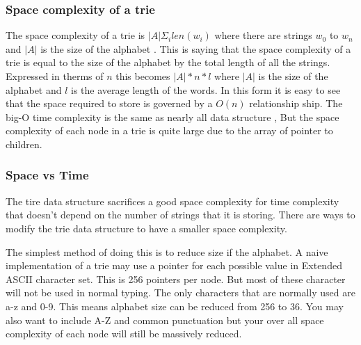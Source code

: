 \documentclass[10pt]{article} %
\begin{document}
			\subsubsection{Space complexity of a trie}
			    The space complexity of a trie is \begin{math} \vert A \vert \Sigma_i len(w_i)\end{math} where there are strings \begin{math} w_0 \end{math} to \begin{math} w_n \end{math} and \begin{math}\vert A \vert \end{math} is the size of the alphabet \cite{book:ADS:complexity}.
			    This is saying that the space complexity of a trie is equal to the size of the alphabet by the total length of all the strings.
			    Expressed in therms of \begin{math} n \end{math} this becomes \begin{math} \vert A \vert * n * l \end{math} where \begin{math}\vert A \vert \end{math} is the size of the alphabet and \begin{math} l \end{math} is the average length of the words.
			    In this form it is easy to see that the space required to store is governed by a  \begin{math} O(n) \end{math} relationship ship. The big-O time complexity is the same as nearly all data structure \cite{website:bigocheatsheet}, But the space complexity of each node in a trie is quite large due to the array of pointer to children.
			    
            \subsubsection{Space vs Time}
                The tire data structure sacrifices a good space complexity for time complexity that doesn't depend on the number of strings that it is storing. 
                There are ways to modify the trie data structure to have a smaller space complexity.
                
                The simplest method of doing this is to reduce size if the alphabet. A naive implementation of a trie may use a pointer for each possible value in Extended ASCII character set. This is 256 pointers per node. But most of these character will not be used in normal typing. The only characters that are normally used are a-z and 0-9. This means alphabet size can be reduced from 256 to 36. You may also want to include A-Z and common punctuation but your over all space complexity of each node will still be massively reduced. 
                
\end{document}
